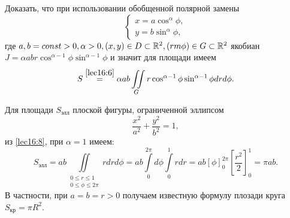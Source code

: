 \documentclass[../../main.tex]{subfiles}
\begin{document}
\begin{exercise}
	Доказать, что при использовании обобщенной полярной замены
	\begin{equation*}
	\begin{cases}
	x=a\cos^\alpha\phi,\\
	y=b\sin^\alpha\phi,
	\end{cases}
	\end{equation*}
	где $
	a,b=const>0,
	\alpha>0, (x,y)\in D \subset \mathbb{R}^2, (rm\phi)\in G\subset \mathbb{R}^2$
	якобиан $J=\alpha a b r \cos^{\alpha-1}\phi\sin^{\alpha-1}\phi$ и значит для 
	площади имеем
	\begin{equation}
	\label{lec16:8}
	S \overset{\ref{lec16:6}}{=} \alpha a b \iint\limits_G r\cos^{\alpha - 1}\phi
	\sin^{\alpha - 1}\phi dr d\phi.
	\end{equation}
\end{exercise}
	\begin{example}
	Для площади $S_{\text{элл}}$ плоской фигуры, ограниченной эллипсом
	\begin{equation*}
	\dfrac{x^2}{a^2} + \dfrac{y^2}{b^2} = 1,
	\end{equation*}
	из \eqref{lec16:8}, при
	$ \alpha = 1 $ имеем:
	\begin{equation*}
	S_{\text{элл}} = 
	ab\iint\limits_
	{\begin{gathered}
		0\leq r\leq1\\
		0\leq \phi \leq 2\pi
		\end{gathered}
	 } rdrd \phi =
	ab \int\limits_0^{2\pi}d\phi\int\limits_0^1rdr =
	ab \left[\phi \right]^{2\pi}_0
	\left[\dfrac{r^2}{2}\right]_0^1 = \pi ab.
	\end{equation*}
	В частности, при $a = b = r > 0$ получаем известную формулу плозади круга 
	$S_{\text{кр}} = \pi R^2$.
\end{example}
\end{document}

